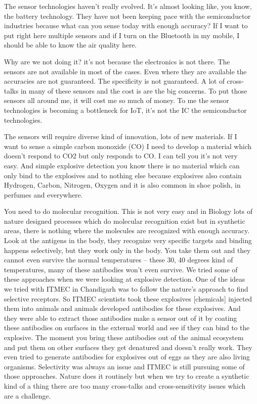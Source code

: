 \begin{multicols}{2}
The sensor technologies haven’t really evolved. It’s almost looking like, you know, the battery technology. They have not been keeping pace with the semiconductor industries because what can you sense today with enough accuracy? If I want to put right here multiple sensors and if I turn on the Bluetooth in my mobile, I should be able to know the air quality here.

Why are we not doing it? it’s not because the electronics is not there. The sensors are not available in most of the cases. Even where they are available the accuracies are not guaranteed. The specificity is not guaranteed. A lot of cross-talks in many of these sensors and the cost is are the big concerns. To put those sensors all around me, it will cost me so much of money. To me the sensor technologies is becoming a bottleneck for IoT, it’s not the IC the semiconductor technologies.

The sensors will require diverse kind of innovation, lots of new materials. If I want to sense a simple carbon monoxide (CO) I need to develop a material which doesn’t respond to CO2 but only responds to CO. I can tell you it’s not very easy.  And simple explosive detection you know there is no material which can only bind to the explosives and to nothing else because explosives also contain Hydrogen, Carbon, Nitrogen, Oxygen and it is also common in shoe polish, in perfumes and everywhere.

You need to do molecular recognition. This is not very easy and in Biology lots of nature designed processes which do molecular recognition exist but in synthetic areas, there is nothing where the molecules are recognized with enough accuracy.  Look at the antigens in the body, they recognize very specific targets and binding happens selectively, but they work only in the body. You take them out and they cannot even survive the normal temperatures -- these 30, 40 degrees kind of temperatures, many of these antibodies won’t even survive. We tried some of these approaches when we were looking at explosive detection. One of the ideas we tried with ITMEC in Chandigarh was to follow the nature’s approach to find selective receptors. So ITMEC scientists took these explosives [chemicals] injected them into animals and animals developed antibodies for these explosives. And they were able to extract those antibodies make a sensor out of it by coating these antibodies on surfaces in the external world and see if they can bind to the explosive.  The moment you bring these antibodies out of the animal ecosystem and put them on other surfaces they get denatured and doesn’t really work. They even tried to generate antibodies for explosives out of eggs as they are also living organisms.  Selectivity was always an issue and ITMEC is still pursuing some of those approaches. Nature does it routinely but when we try to create a synthetic kind of a thing there are too many cross-talks and cross-sensitivity issues which are a challenge.


\end{multicols}

